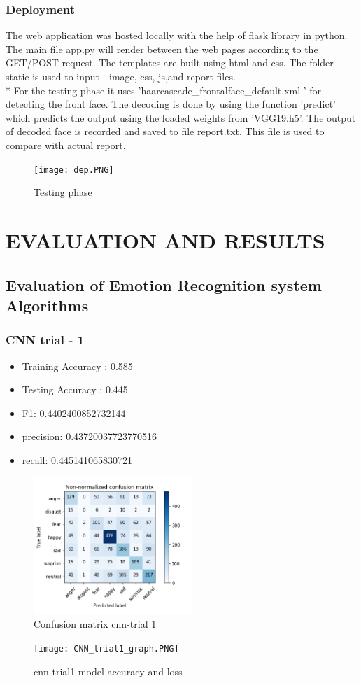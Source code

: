  \subsection{Deployment}
 The web application was hosted locally with the help of flask library in python.
 The main file app.py will render between the web pages according to the GET/POST request. The templates are built using html and css. The folder static is used to input - image, css, js,and report files. 
 \\* For the testing phase it uses 'haarcascade\_frontalface\_default.xml ' for detecting the front face. The decoding is done by using the function 'predict' which
 predicts the output using the loaded  weights from 'VGG19.h5'. The output of decoded face is recorded and saved to file report.txt. This file is used to compare with actual report.
 \begin{figure}[h]
\label{ss}
\centering
\texttt{[image: dep.PNG]}
\caption{Testing phase}
\end{figure}
 
 
 



\chapter{EVALUATION AND RESULTS}
\section{Evaluation of Emotion Recognition system Algorithms}
\subsection{CNN trial - 1}
\begin{itemize}
  \item Training Accuracy : 0.585
  \item Testing Accuracy  : 0.445
  \item F1: 0.4402400852732144
  \item precision: 0.43720037723770516
 \item  recall: 0.445141065830721
\end{itemize}
\begin{figure}[h]
\label{ss}
\centering
\includegraphics[width= 6cm]{confmatr_cnn1.PNG}
\caption{Confusion matrix cnn-trial 1}
\end{figure}
\begin{figure}[h]
\label{ss}
\centering
\texttt{[image: CNN\_trial1\_graph.PNG]}
\caption{cnn-trial1 model accuracy and loss}
\end{figure}

